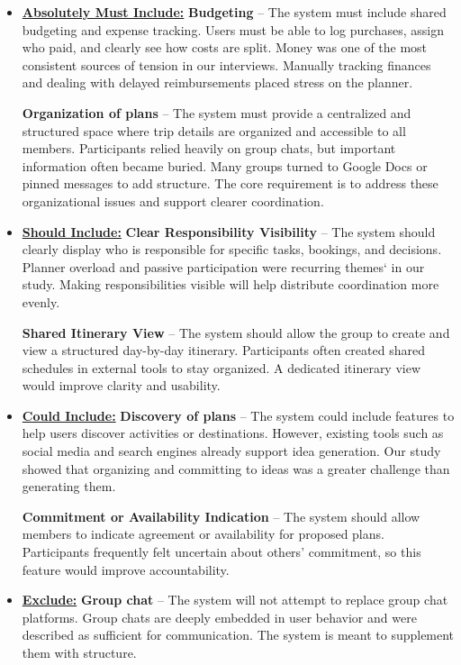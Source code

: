 \documentclass[12pt,a4paper]{article}
\begin{document}
\begin{itemize}[topsep=4pt,itemsep=4pt,parsep=0pt,partopsep=0pt]

    \item \underline{\textbf{Absolutely Must Include:}}
    \textbf{Budgeting} – The system must include shared budgeting and expense tracking. Users must be able to log purchases, assign who paid, and clearly see how costs are split. Money was one of the most consistent sources of tension in our interviews. Manually tracking finances and dealing with delayed reimbursements placed stress on the planner.
    
    \textbf{Organization of plans} – The system must provide a centralized and structured space where trip details are organized and accessible to all members. Participants relied heavily on group chats, but important information often became buried. Many groups turned to Google Docs or pinned messages to add structure. The core requirement is to address these organizational issues and support clearer coordination.

    \item \underline{\textbf{Should Include:}}
    \textbf{Clear Responsibility Visibility} – The system should clearly display who is responsible for specific tasks, bookings, and decisions. Planner overload and passive participation were recurring themes` in our study. Making responsibilities visible will help distribute coordination more evenly.

    \textbf{Shared Itinerary View} – The system should allow the group to create and view a structured day-by-day itinerary. Participants often created shared schedules in external tools to stay organized. A dedicated itinerary view would improve clarity and usability.

    \item \underline{\textbf{Could Include:}}
    \textbf{Discovery of plans} – The system could include features to help users discover activities or destinations. However, existing tools such as social media and search engines already support idea generation. Our study showed that organizing and committing to ideas was a greater challenge than generating them.

    \textbf{Commitment or Availability Indication} – The system should allow members to indicate agreement or availability for proposed plans. Participants frequently felt uncertain about others’ commitment, so this feature would improve accountability.

    \item \underline{\textbf{Exclude:}}
    \textbf{Group chat} – The system will not attempt to replace group chat platforms. Group chats are deeply embedded in user behavior and were described as sufficient for communication. The system is meant to supplement them with structure.

\end{itemize}
\end{document}
